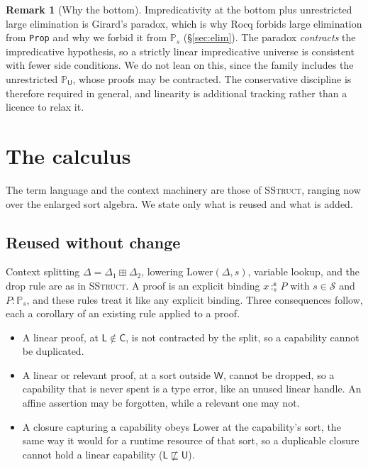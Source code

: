 \documentclass[11pt]{article}
\newcommand{\Srt}{\mathcal{S}}
\newcommand{\Wk}{\mathsf{W}}
\newcommand{\Co}{\mathsf{C}}
\newcommand{\sle}{\sqsubseteq}
\newcommand{\Prop}[1]{\mathbb{P}_{#1}}            %
\newcommand{\ex}{\mathsf{e}}                      %
\newcommand{\bind}[3]{#1\,{:}^{#2}_{#3}\,}        %
\newcommand{\msum}{\boxplus}                       %
\theoremstyle{definition}
\newtheorem{remark}[definition]{Remark}
\theoremstyle{plain}
\begin{document}
\begin{remark}[Why the bottom]
Impredicativity at the bottom plus unrestricted large elimination is Girard's
paradox, which is why Rocq forbids large elimination from \texttt{Prop} and why we
forbid it from $\Prop{s}$ (\S\ref{sec:elim}). The paradox \emph{contracts} the
impredicative hypothesis, so a strictly linear impredicative universe is
consistent with fewer side conditions. We do not lean on this, since the family
includes the unrestricted $\Prop{\mathsf{U}}$, whose proofs may be contracted. The
conservative discipline is therefore required in general, and linearity is
additional tracking rather than a licence to relax it.
\end{remark}

\section{The calculus}\label{sec:calculus}

The term language and the context machinery are those of \textsc{SStruct},
ranging now over the enlarged sort algebra. We state only what is reused and what
is added.

\subsection{Reused without change}

Context splitting $\Delta=\Delta_1\msum\Delta_2$, lowering
$\mathrm{Lower}(\Delta,s)$, variable lookup, and the drop rule are as in
\textsc{SStruct}. A proof is an explicit binding $\bind{x}{\ex}{s}P$ with
$s\in\Srt$ and $P:\Prop{s}$, and these rules treat it like any explicit binding.
Three consequences follow, each a corollary of an existing rule applied to a
proof.
\begin{itemize}
\item A linear proof, at $\mathsf{L}\notin\Co$, is not contracted by the split, so
a capability cannot be duplicated.
\item A linear or relevant proof, at a sort outside $\Wk$, cannot be dropped, so a
capability that is never spent is a type error, like an unused linear handle. An
affine assertion may be forgotten, while a relevant one may not.
\item A closure capturing a capability obeys $\mathrm{Lower}$ at the capability's
sort, the same way it would for a runtime resource of that sort, so a duplicable
closure cannot hold a linear capability ($\mathsf{L}\not\sle\mathsf{U}$).
\end{itemize}
\end{document}
